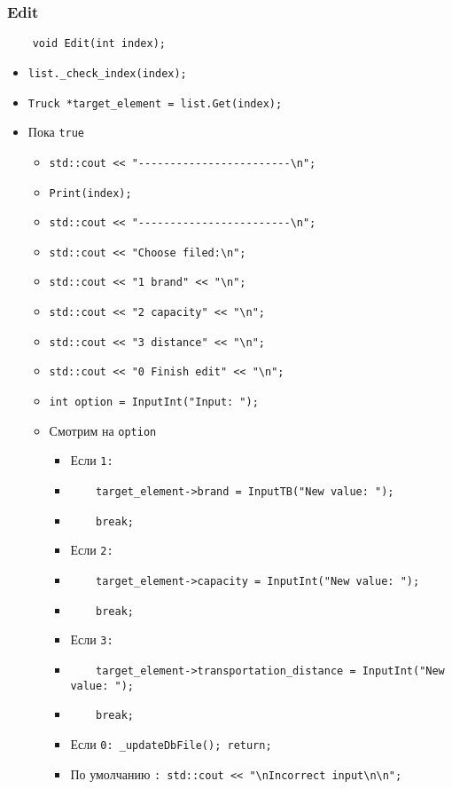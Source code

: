 \subsubsection{Edit}

\begin{lstlisting}
    void Edit(int index);
\end{lstlisting}

\begin{itemize}
    \item \verb|list._check_index(index);|
    \item \verb|Truck *target_element = list.Get(index);|
    \item Пока \verb|true|
        \begin{itemize}
            \item \verb|std::cout << "------------------------\n";|
            \item \verb|Print(index);|
            \item \verb|std::cout << "------------------------\n";|
            \item \verb|std::cout << "Choose filed:\n";|
            \item \verb|std::cout << "1 brand" << "\n";|
            \item \verb|std::cout << "2 capacity" << "\n";|
            \item \verb|std::cout << "3 distance" << "\n";|
            \item \verb|std::cout << "0 Finish edit" << "\n";|
            \item \verb|int option = InputInt("Input: ");|
            \item Смотрим на \verb|option|
            \begin{itemize}
                \item Если \verb|1:|
                \item \verb|    target_element->brand = InputTB("New value: ");|
                \item \verb|    break;|
                \item Если \verb|2:|
                \item \verb|    target_element->capacity = InputInt("New value: ");|
                \item \verb|    break;|
                \item Если \verb|3:|
                \item \verb|    target_element->transportation_distance = InputInt("New value: ");|
                \item \verb|    break;|
                \item Если \verb|0: _updateDbFile(); return;|
                \item По умолчанию \verb|: std::cout << "\nIncorrect input\n\n";|
            \end{itemize}
        \end{itemize}
\end{itemize}

